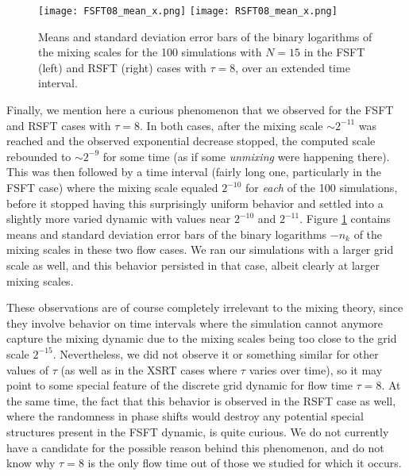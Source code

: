 \documentclass[12pt]{article}
\numberwithin{figure}{section}
\numberwithin{equation}{section}
\begin{document}
\begin{figure}[htbp]
    \centering
        \texttt{[image: FSFT08\_mean\_x.png]}
        \texttt{[image: RSFT08\_mean\_x.png]}      
    \caption{Means and standard deviation error bars of the binary logarithms of the mixing scales for the 100 simulations 
   with $N = 15$ in the FSFT  (left) and RSFT   (right) cases with $\tau=8$, over an extended time interval.}
    \label{kinks}
\end{figure}

Finally, we mention here a curious phenomenon that we observed for the FSFT and RSFT cases with $\tau=8$.  In both cases, after the mixing scale $\sim 2^{-11}$ was reached and the observed exponential decrease stopped, the computed scale rebounded to $\sim 2^{-9}$ for some time (as if some {\it unmixing} were happening there).  This was then followed by a time interval (fairly long one, particularly in the FSFT case) where the mixing scale equaled $2^{-10}$ for {\it each} of the 100 simulations, before it stopped having this surprisingly uniform behavior and settled into a slightly more varied dynamic with values near $2^{-10}$ and $2^{-11}$.  
Figure \ref{kinks} contains means and standard deviation error bars of the binary logarithms $-n_k$ of the mixing scales   in these two flow cases.
We ran our simulations with a larger grid scale as well, and this behavior persisted in that case, albeit clearly at larger mixing scales.



These observations are of course completely irrelevant to the mixing theory, since they involve behavior on time intervals where the simulation cannot anymore capture the mixing dynamic due to the mixing scales being too close to the grid scale $2^{-15}$.  Nevertheless, we did not observe it or something similar for other values of $\tau$ (as well as in the XSRT cases where $\tau$ varies over time), so it may point to some special feature of the discrete grid dynamic for flow time $\tau=8$.  At the same time, the fact that this behavior is observed in the RSFT case as well, where the randomness in phase shifts would destroy any potential special structures present in the FSFT dynamic, is quite curious.  We do not currently have a candidate for the possible reason behind this phenomenon, and do not know why $\tau=8$ is the only flow time out of those we studied for which it occurs.
\end{document}

